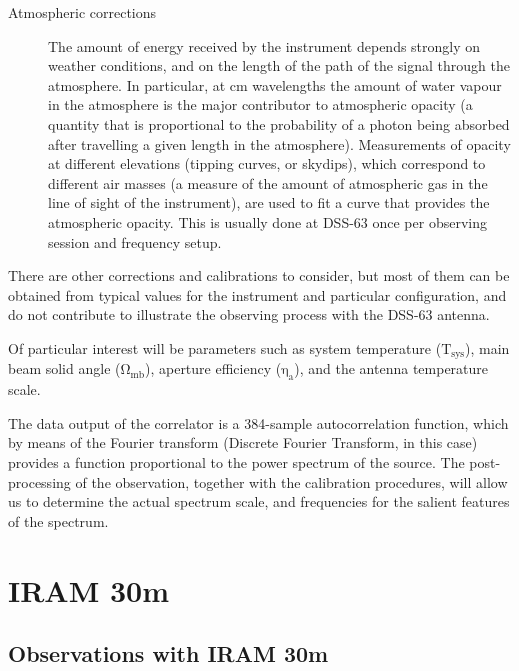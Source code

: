 \begin{description}
	\item[Atmospheric corrections] The amount of energy received
       by the instrument depends strongly on weather conditions, and
       on the length of the path of the signal through the
       atmosphere. In particular, at cm wavelengths the amount of
       water vapour in the atmosphere is the major contributor to
       atmospheric opacity (a quantity that is proportional to the
       probability of a photon being absorbed after travelling a
       given length in the atmosphere). Measurements of opacity at
       different elevations (tipping curves, or skydips), which
       correspond to different air masses (a measure of the amount
       of atmospheric gas in the line of sight of the instrument),
       are used to fit a curve that provides the atmospheric
       opacity. This is usually done at DSS-63 once per observing
       session and frequency setup.
\end{description}

There are other corrections and calibrations to consider, but most of
them can be obtained from typical values for the instrument and
particular configuration, and do not contribute to illustrate the
observing process with the DSS-63 antenna.

Of particular interest will be parameters such as system temperature
($\mathrm{T_{sys}}$), main beam solid angle ($\mathrm{\Omega_{mb}}$),
aperture efficiency ($\mathrm{\eta_a}$), and the antenna temperature
scale.

The data output of the correlator is a 384-sample autocorrelation
function, which by means of the Fourier transform (Discrete Fourier
Transform, in this case) provides a function proportional to the
power spectrum of the source. The post-processing of the observation,
together with the calibration procedures, will allow us to determine
the actual spectrum scale, and frequencies for the salient features
of the spectrum.




\section{IRAM 30m} %
\label{sec:iram_30m}

\subsection{Observations with IRAM 30m} %
\label{sub:observations_with_iram_30m}




